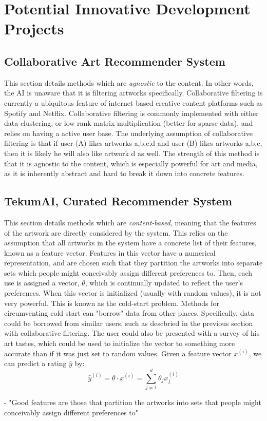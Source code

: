 \documentclass[fontsize=12pt]{scrartcl} %
\numberwithin{equation}{section} %
\numberwithin{figure}{section} %
\numberwithin{table}{section} %
\begin{document}
\section{Potential Innovative Development Projects}
\subsection{Collaborative Art Recommender System}
 This section details methods which are \textit{agnostic} to the content. In other words, the AI is unaware that it is filtering artworks specifically. Collaborative filtering is currently a ubiquitous feature of internet based creative content platforms such as Spotify and Netflix. Collaborative filtering is commonly implemented with either data clustering, or low-rank matrix multiplication (better for sparse data), and relies on having a active user base. The underlying assumption of collaborative filtering is that if user (A) likes artworks {a,b,c,d} and user (B) likes artworks {a,b,c}, then it is likely he will also like artwork {d} as well. The strength of this method is that it is agnostic to the content, which is especially powerful for art and media, as it is inherently abstract and hard to break it down into concrete features.

\subsection{TekumAI, Curated Recommender System}
 This section details methods which are \textit{content-based}, meaning that the features of the artwork are directly considered by the system. This relies on the assumption that all artworks in the system have a concrete list of their features, known as a feature vector. Features in this vector have a numerical representation, and are chosen such that they partition the artworks into separate sets which people might conceivably assign different preferences to. Then, each use is assigned a vector, $\theta$, which is continually updated to reflect the user's preferences. When this vector is initialized (usually with random values), it is not very powerful. This is known as the cold-start problem. Methods for circumventing cold start can "borrow" data from other places. Specifically, data could be borrowed from similar users, such as descbried in the previous section with collaborative filtering. The user could also be presented with a survey of his art tastes, which could be used to initialize the vector to something more accurate than if it was just set to random values. Given a feature vector $x^{(i)}$, we can predict a rating $\hat{y}$ by:
 $$ \hat{y}^{(i)} = \theta \cdot x^{(i)} = \sum_{j=1}^d \theta_jx^{(i)}_j $$


- "Good features are those that partition the artworks into sets that people might
conceivably assign different preferences to"
\end{document}
